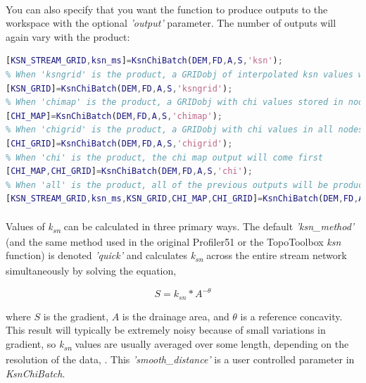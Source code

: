 \paragraph{}You can also specify that you want the function to produce outputs to the workspace with the optional \textit{'output'} parameter. The number of outputs will again vary with the product:

\begin{lstlisting}[language=Matlab]
% When 'ksn' is the 'product', two outputs will be produced, a GRIDobj with averaged ksn values stored in nodes along the stream network  (KSN_STREAM_GRID) and a geographic information structure of ksn values (ksn_ms)
[KSN_STREAM_GRID,ksn_ms]=KsnChiBatch(DEM,FD,A,S,'ksn');
% When 'ksngrid' is the product, a GRIDobj of interpolated ksn values will be produced
[KSN_GRID]=KsnChiBatch(DEM,FD,A,S,'ksngrid');
% When 'chimap' is the product, a GRIDobj with chi values stored in nodes along the stream network will be produced
[CHI_MAP]=KsnChiBatch(DEM,FD,A,S,'chimap');
% When 'chigrid' is the product, a GRIDobj with chi values in all nodes not excluded by outlet conditions will be produced
[CHI_GRID]=KsnChiBatch(DEM,FD,A,S,'chigrid');
% When 'chi' is the product, the chi map output will come first
[CHI_MAP,CHI_GRID]=KsnChiBatch(DEM,FD,A,S,'chi');
% When 'all' is the product, all of the previous outputs will be produced in the following order
[KSN_STREAM_GRID,ksn_ms,KSN_GRID,CHI_MAP,CHI_GRID]=KsnChiBatch(DEM,FD,A,S,'all');
\end{lstlisting}

\paragraph{}Values of \textit{k\textsubscript{sn}} can be calculated in three primary ways. The default \textit{'ksn\_method'} (and the same method used in the original Profiler51 or the TopoToolbox \textit{ksn} function) is denoted \textit{'quick'} and calculates \textit{k\textsubscript{sn}} across the entire stream network simultaneously by solving the equation, 

\begin{equation}
 S=k_{sn}*A^{-\theta}
\end{equation}

\noindent where $S$ is the gradient, $A$ is the drainage area, and $\theta$ is a reference concavity. This result will typically be extremely noisy because of small variations in gradient, so \textit{k\textsubscript{sn}} values are usually averaged over some length, depending on the resolution of the data, \citep[e.g.,][]{Wobus2006}. This \textit{'smooth\_distance'} is a user controlled parameter in \textit{KsnChiBatch}. 

